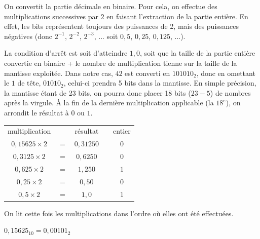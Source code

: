 \documentclass[11pt,a4paper]{article}
\begin{document}
\medskip

On convertit la partie décimale en binaire.
Pour cela, on effectue des multiplications successives par $ 2 $ en faisant l'extraction de la partie entière.
En effet, les bits représentent toujours des puissances de 2, mais des puissances négatives (donc $ 2^{-1} $, $ 2^{-2} $, $ 2^{-3} $, ... soit $ 0,5 $, $ 0,25 $, $ 0,125 $, ...).

\medskip

La condition d'arrêt est soit d'atteindre $ 1,0 $, soit que la taille de la partie entière convertie en binaire + le nombre de multiplication tienne sur la taille de la mantisse exploitée.
Dans notre cas, $ 42 $ est converti en $ 101010_{2} $, donc en omettant le $ 1 $ de tête, $ 01010_{2} $, celui-ci prendra 5 bits dans la mantisse.
En simple précision, la mantisse étant de 23 bits, on pourra donc placer 18 bits ($ 23 - 5 $) de nombres après la virgule.
À la fin de la dernière multiplication applicable (la $ 18^e $), on arrondit le résultat à $ 0 $ ou $ 1 $.

\medskip

\begin{center}
\begin{tabular}{c c c   m{1cm}   c }
multiplication        &         & résultat    & & entier \\
$ 0,15625 \times 2 $  &  $ = $  &  $ 0,31250 $ & & $ 0 $ \\
$ 0,3125  \times 2 $  &  $ = $  &  $ 0,6250  $ & & $ 0 $ \\
$ 0,625   \times 2 $  &  $ = $  &  $ 1,250   $ & & $ 1 $ \\
$ 0,25    \times 2 $  &  $ = $  &  $ 0,50    $ & & $ 0 $ \\
$ 0,5     \times 2 $  &  $ = $  &  $ 1,0     $ & & $ 1 $ \\
\end{tabular}
\end{center}

\medskip

On lit cette fois les multiplications dans l'ordre où elles ont été effectuées.

\medskip

$ 0,15625_{10} = 0,00101_{2} $
\end{document}
